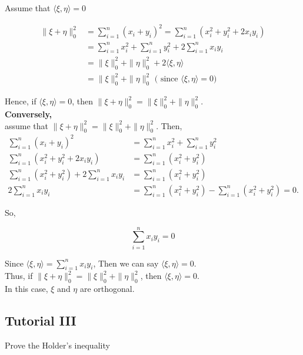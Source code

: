 \documentclass{article}
\begin{document}
Assume that $\langle\xi, \eta\rangle=0$

$$\begin{align}
\|\xi+\eta\|_{0}^{2}&=\sum_{i=1}^{n}\left(x_{i}+y_{i}\right)^{2}=\sum_{i=1}^{n}\left(x_{i}^{2}+y_{i}^{2}+2 x_{i} y_{i}\right)\\
&=\sum_{i=1}^{n} x_{i}^{2}+\sum_{i=1}^{n} y_{i}^{2}+2\sum_{i=1}^{n} x_iy_{i}\\
&=\|\xi\|_{0}^{2}+\|\eta\|_{0}^{2}
+2\langle \xi,\eta \rangle\\
&=\|\xi\|_{0}^{2}+\|\eta\|_{0}^{2} \text{ ( since }\langle \xi,\eta \rangle=0)
\end{align}$$


Hence, if $\langle\xi, \eta\rangle=0$, then $\|\xi+\eta\|_{0}^{2}=\|\xi\|_{0}^{2}+\|\eta\|_{0}^{2}$.\\

\textbf{Conversely, }\\

assume that $\|\xi+\eta\|_{0}^{2}=\|\xi\|_{0}^{2}+\|\eta\|_{0}^{2}$. Then,
$$
\begin{aligned}
\sum_{i=1}^{n}\left(x_{i}+y_{i}\right)^{2} & =\sum_{i=1}^{n} x_{i}^{2}+\sum_{i=1}^{n} y_{i}^{2} \\
\sum_{i=1}^{n}\left(x_{i}^{2}+y_{i}^{2}+2 x_{i} y_{i}\right) & =\sum_{i=1}^{n}\left(x_{i}^{2}+y_{i}^{2}\right) \\
\sum_{i=1}^{n}\left(x_{i}^{2}+y_{i}^{2}\right)+2 \sum_{i=1}^{n} x_{i} y_{i} & =\sum_{i=1}^{n}\left(x_{i}^{2}+y_{i}^{2}\right) \\
2 \sum_{i=1}^{n} x_{i} y_{i} & =\sum_{i=1}^{n}\left(x_{i}^{2}+y_{i}^{2}\right)-\sum_{i=1}^{n}\left(x_{i}^{2}+y_{i}^{2}\right)=0 .
\end{aligned}
$$

So,

$$
\sum_{i=1}^{n} x_{i} y_{i}=0
$$

Since $\langle\xi, \eta\rangle=\sum_{i=1}^{n} x_{i} y_{i}$, Then we can say $\langle\xi, \eta\rangle=0$.\\

Thus, if $\|\xi+\eta\|_{0}^{2}=\|\xi\|_{0}^{2}+\|\eta\|_{0}^{2}$, then $\langle\xi, \eta\rangle=0$.\\

In this case, $\xi$ and $\eta$ are orthogonal.



\newpage
\subsection{Tutorial III}
Prove the Holder's inequality
\end{document}
